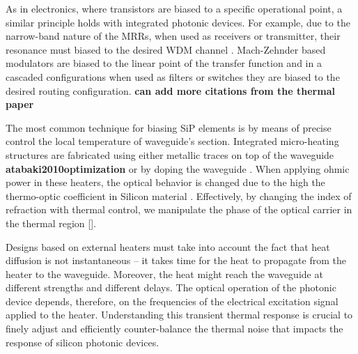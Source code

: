 As in electronics, where transistors are biased to a specific operational point, a similar principle holds with integrated photonic devices. For example, due to the narrow-band nature of the MRRs, when used as receivers or transmitter, their resonance must biased to the desired WDM channel \cite{bogaerts2012silicon}. Mach-Zehnder based modulators are biased to the linear point of the transfer function \cite{li2013any} and in a cascaded configurations when used as filters \cite{Guan_1xN,horst2013cascaded} or switches \cite{chen2016low} they are biased to the desired routing configuration. \textbf{can add more citations from the thermal paper}

The most common technique for biasing SiP elements is by means of precise control the local temperature of waveguide's section. Integrated micro-heating structures are fabricated using either metallic traces on top of the waveguide \textbf{atabaki2010optimization} or by doping the waveguide \cite{harris2014efficient}. When applying ohmic power in these heaters, the optical behavior is changed due to the high the thermo-optic coefficient in Silicon material \cite{komma2012thermo}. Effectively, by changing the index of refraction with thermal control, we manipulate the phase of the optical carrier in the thermal region []. 

Designs based on external heaters must take into account the fact that heat diffusion is not instantaneous -- it takes time for the heat to propagate from the heater to the waveguide. Moreover, the heat might reach the waveguide at different strengths and different delays.  The optical operation of the photonic device depends, therefore, on the frequencies of the electrical excitation signal applied to the heater. Understanding this transient thermal response is crucial to finely adjust and efficiently counter-balance the thermal noise that impacts the response of silicon photonic devices. 



